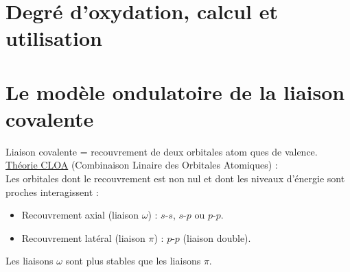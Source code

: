 \documentclass[13pt, twoside, a4paper, french, tikz]{report}
\begin{document}
  
  \section{Degré d'oxydation, calcul et utilisation}\label{sec:degre-d'oxydation-calcul-et-utilisation}
  
  
  \section{Le modèle ondulatoire de la liaison covalente}\label{sec:le-modele-ondulatoire-de-la-liaison-covalente}
  
    Liaison covalente = recouvrement de deux orbitales atom ques de valence.\\
    
    \underline{Théorie CLOA} (Combinaison Linaire des Orbitales Atomiques) :\\
    
    Les orbitales dont le recouvrement est non nul et dont les niveaux d'énergie sont proches interagissent :
    \begin{itemize}
      \item Recouvrement axial (liaison $\omega$) : $s$-$s$, $s$-$p$ ou $p$-$p$.
      \item Recouvrement latéral (liaison $\pi$) : $p$-$p$ (liaison double).
    \end{itemize}
    Les liaisons $\omega$ sont plus stables que les liaisons $\pi$.\\
\end{document}
